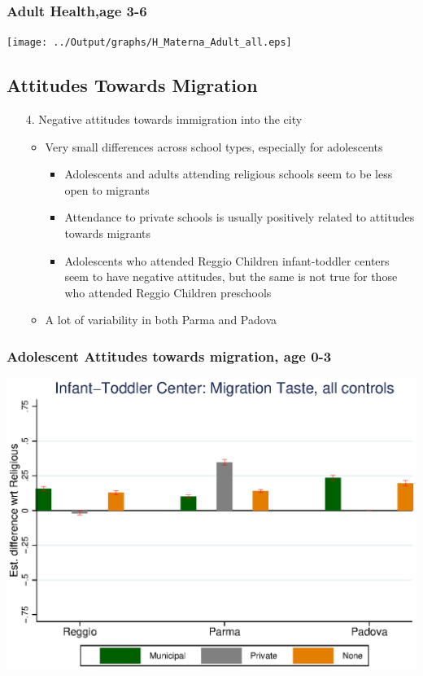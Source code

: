 \documentclass{beamer}
\begin{document}
\begin{frame}\frametitle{Adult Health,age 3-6}
\center
\texttt{[image: ../Output/graphs/H\_Materna\_Adult\_all.eps]}
\end{frame}

\subsection{Attitudes Towards Migration}
\begin{frame}
\begin{itemize}
	\centering
	\item[4.] Negative attitudes towards immigration into the city
	\vspace{3ex}
	\begin{itemize}
		\item Very small differences across school types, especially for adolescents
		\begin{itemize}
			\item Adolescents and adults attending religious schools seem to be less open to migrants
			\item Attendance to private schools is usually positively related to attitudes towards migrants
			\item Adolescents who attended Reggio Children infant-toddler centers seem to have negative attitudes, but the same is not true for those who attended Reggio Children preschools
		\end{itemize}
		\vspace{2ex}
		\item A lot of variability in both Parma and Padova
	\end{itemize}
\end{itemize}
\end{frame}

\begin{frame}\frametitle{Adolescent Attitudes towards migration, age 0-3}
\center
\includegraphics[scale=0.7]{../Output/graphs/M_Asilo_Adol_all.eps}
\end{frame}
\end{document}
